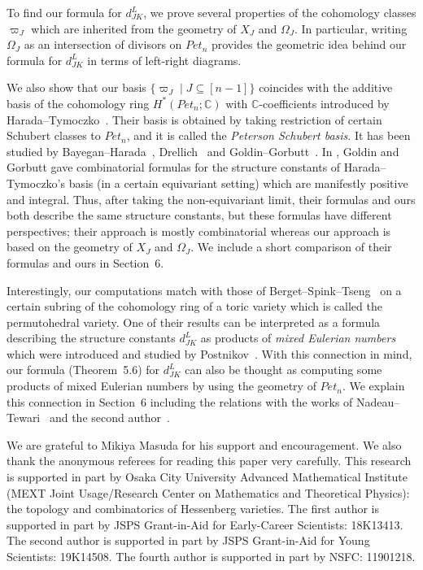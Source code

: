 \documentclass[11pt]{article}
\theoremstyle{definition}
\providecommand{\longthanks}[1]{\par\smallskip\noindent #1\par\smallskip}
\numberwithin{equation}{section}
\numberwithin{equation}{section}
\begin{document}
To find our formula for $d_{JK}^L$, 
we prove several properties of the cohomology classes $\varpi_J$ which are inherited from the geometry of $X_J$ and $\Omega_J$.
In particular, writing $\Omega_J$ as an intersection of divisors on $Pet_{n}$ provides the geometric idea behind our formula for $d_{JK}^L$ in terms of left-right diagrams.

We also show that our basis $\{\varpi_J\mid J\subseteq[n-1]\}$ coincides with the additive basis of the cohomology ring $H^*(Pet_{n};{\mathbb C})$ with ${\mathbb C}$-coefficients introduced by Harada--Tymoczko~\cite{HaTy}. Their basis is obtained by taking restriction of certain Schubert classes to $Pet_{n}$, and it is called the \textit{Peterson Schubert basis}. It has been studied by Bayegan--Harada~\cite{BaHa}, Drellich~\cite{Dre2} and Goldin--Gorbutt~\cite{GoGo}. In \cite{GoGo}, Goldin and Gorbutt gave combinatorial formulas for the structure constants of Harada--Tymoczko's basis (in a certain equivariant setting) which are manifestly positive and integral. 
Thus, after taking the non-equivariant limit, their formulas and ours both describe the same structure constants, but these formulas have different perspectives; 
their approach is mostly combinatorial whereas our approach is based on the geometry of $X_J$ and $\Omega_J$. We include a short comparison of their formulas and ours in Section~6.

Interestingly, our computations match with those of Berget--Spink--Tseng~\cite[Sect.~7]{Berget-Spink-Tseng} on a certain subring of the cohomology ring of a toric variety which is called the permutohedral variety.
One of their results can be interpreted as a formula describing the structure constants $d_{JK}^L$ as products of \textit{mixed Eulerian numbers} which were introduced and studied by Postnikov~\cite{Postnikov09}.
With this connection in mind, our formula (Theorem~5.6) for $d_{JK}^L$ can also be thought as computing some products of mixed Eulerian numbers by using the geometry of $Pet_{n}$.
We explain this connection in Section~6 including the relations with the works of Nadeau--Tewari~\cite{Nadeau-Tewari} and the second author~\cite{Horiguchi21}.

\longthanks{We are grateful to Mikiya Masuda for his support and encouragement. We also thank the anonymous referees for reading this paper very carefully. This research is supported in part by Osaka City University Advanced Mathematical Institute (MEXT Joint Usage/Research Center on Mathematics and Theoretical Physics): the topology and combinatorics of Hessenberg varieties. The first author is supported in part by JSPS Grant-in-Aid for Early-Career Scientists: 18K13413. The second author is supported in part by JSPS Grant-in-Aid for Young Scientists: 19K14508. The fourth author is supported in part by NSFC: 11901218.}
\end{document}
